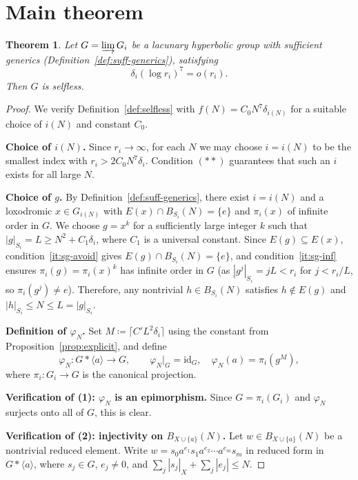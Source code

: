 \documentclass[12pt]{amsart}
\theoremstyle{plain}
\newtheorem{theorem}{Theorem}[section]
\theoremstyle{definition}
\begin{document}
\section{Main theorem}\label{sec:main}

\begin{theorem}\label{thm:main}
Let $G = \varinjlim G_i$ be a lacunary hyperbolic group with sufficient generics
(Definition~\ref{def:suff-generics}), satisfying
\[
  \delta_i(\log r_i)^{7} = o(r_i). \tag{$**$}
\]
Then $G$ is selfless.
\end{theorem}

\begin{proof}
We verify Definition~\ref{def:selfless} with $f(N) = C_0 N^{7}\delta_{i(N)}$
for a suitable choice of $i(N)$ and constant $C_0$.

\medskip\noindent\textbf{Choice of $i(N)$.}
Since $r_i \to \infty$, for each $N$ we may choose $i = i(N)$ to be the smallest
index with $r_i > 2C_0 N^{7}\delta_i$.
Condition $(**)$ guarantees that such
an $i$ exists for all large $N$.

\medskip\noindent\textbf{Choice of $g$.}
By Definition~\ref{def:suff-generics}, there exist $i = i(N)$ and a loxodromic
$x \in G_{i(N)}$ with $E(x) \cap B_{S_i}(N) = \{e\}$ and $\pi_i(x)$ of infinite
order in $G$.
We choose $g = x^k$ for a sufficiently large integer $k$ such that
$|g|_{S_i} = L \geq N^2 + C_1\delta_i$, where $C_1$ is a universal constant.
Since $E(g) \subseteq E(x)$, condition~\ref{it:sg-avoid} gives
$E(g) \cap B_{S_i}(N) = \{e\}$, and condition~\ref{it:sg-inf} ensures
$\pi_i(g) = \pi_i(x)^k$ has infinite order in $G$
(as $|g^j|_{S_i} = jL < r_i$ for $j < r_i/L$, so $\pi_i(g^j) \neq e$).
Therefore, any nontrivial $h \in B_{S_i}(N)$ satisfies $h \notin E(g)$ and
$|h|_{S_i} \leq N \leq L = |g|_{S_i}$.

\medskip\noindent\textbf{Definition of $\varphi_N$.}
Set $M \coloneqq \lceil C' L^2 \delta_i \rceil$ using the constant from
Proposition~\ref{prop:explicit}, and define
\[
  \varphi_N \colon G * \langle a \rangle \to G, \qquad
  \varphi_N|_G = \mathrm{id}_G, \quad \varphi_N(a) = \pi_i(g^M),
\]
where $\pi_i \colon G_i \to G$ is the canonical projection.

\medskip\noindent\textbf{Verification of (1): $\varphi_N$ is an epimorphism.}
Since $G = \pi_i(G_i)$ and $\varphi_N$ surjects onto all of $G$, this is clear.

\medskip\noindent\textbf{Verification of (2): injectivity on $B_{X\cup\{a\}}(N)$.}
Let $w \in B_{X\cup\{a\}}(N)$ be a nontrivial reduced element.
Write
$w = s_0 a^{e_1} s_1 a^{e_2} \cdots a^{e_m} s_m$ in reduced form in $G * \langle a \rangle$,
where $s_j \in G$, $e_j \neq 0$, and $\sum_j |s_j|_X + \sum_j |e_j| \leq N$.


\end{proof}
\end{document}

